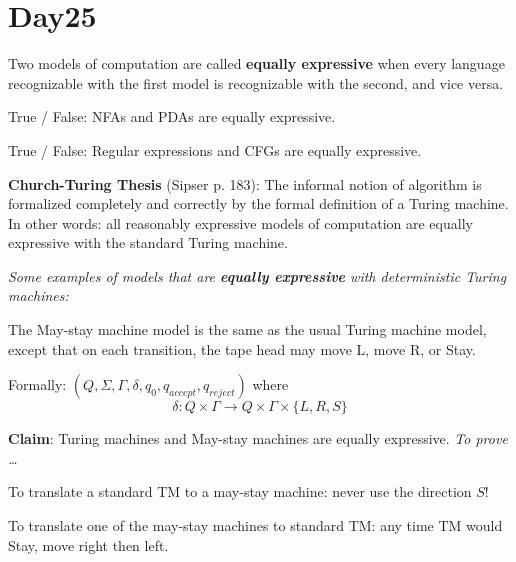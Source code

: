 \documentclass[12pt, oneside]{article}
\begin{document}
\section*{Day25}





Two models of computation are called {\bf equally expressive} when 
every language recognizable with the first model is recognizable with the second, and vice versa.

True / False: NFAs and PDAs are equally expressive.

True / False: Regular expressions and CFGs are equally expressive.


{\bf  Church-Turing Thesis} (Sipser p. 183): The informal notion of algorithm is formalized completely  and correctly by the 
formal definition of a  Turing machine. In other words: all reasonably expressive models of 
computation are equally expressive with the standard Turing machine.


\begin{center}
{\large \it  Some examples of models that are {\bf equally expressive} with deterministic Turing machines: }
\end{center}

\vfill

The May-stay machine model is the same as the usual Turing machine model,  except that
on each transition, the tape head may move L, move R, or Stay. 

Formally: $(Q, \Sigma, \Gamma, \delta, q_0, q_{accept}, q_{reject})$ where 
\[
  \delta: Q \times \Gamma \to Q \times \Gamma \times \{L, R, S\}
\]

{\bf Claim}: Turing machines and May-stay machines are equally expressive. {\it To prove \ldots}

To translate a standard TM to a may-stay machine: never use the direction $S$!


To translate one  of the  may-stay machines to standard TM:
any time TM would Stay, move right  then  left.

\begin{comment}
Formally: suppose $M_S =  (Q, \Sigma, \Gamma, \delta, q_0, q_{acc}, q_{rej})$
has $\delta: Q \times \Gamma \to Q \times \Gamma \times \{L, R, S\}$. Define
the Turing-machine
\[
  M_{new} =  (\phantom{\hspace{2.5in}})
\]

\vfill


\phantom{$M_{new}$ construction here \vspace{400pt}}
\vfill
\end{comment}
\end{document}
